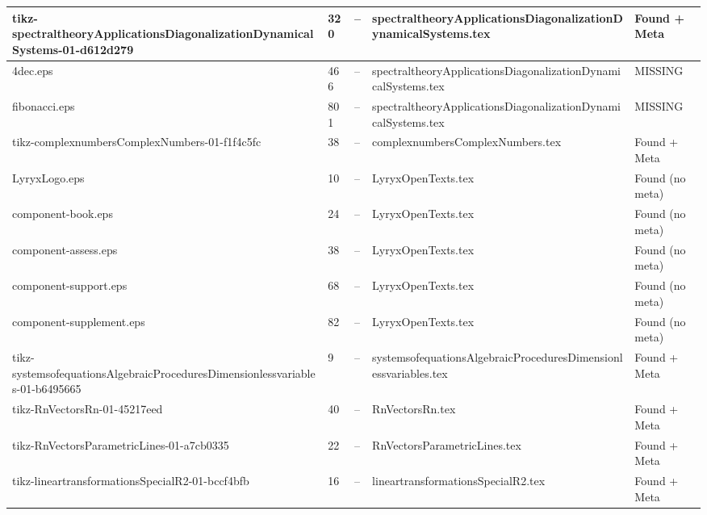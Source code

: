\documentclass[11pt]{article}
\begin{document}
\begin{longtable}{|p{3.5cm}|p{1.5cm}|p{1cm}|p{4cm}|p{2cm}|}
tikz-spectraltheoryApplicationsDiagonalizationDynamicalSystems-01-d612d279 & 320 & -- & spectraltheoryApplicationsDiagonalizationDynamicalSystems.tex & \textcolor{found}{Found + Meta} \\
\hline

4dec.eps & 466 & -- & spectraltheoryApplicationsDiagonalizationDynamicalSystems.tex & \textcolor{missing}{MISSING} \\
\hline

fibonacci.eps & 801 & -- & spectraltheoryApplicationsDiagonalizationDynamicalSystems.tex & \textcolor{missing}{MISSING} \\
\hline

tikz-complexnumbersComplexNumbers-01-f1f4c5fc & 38 & -- & complexnumbersComplexNumbers.tex & \textcolor{found}{Found + Meta} \\
\hline

LyryxLogo.eps & 10 & -- & LyryxOpenTexts.tex & \textcolor{warning}{Found (no meta)} \\
\hline

component-book.eps & 24 & -- & LyryxOpenTexts.tex & \textcolor{warning}{Found (no meta)} \\
\hline

component-assess.eps & 38 & -- & LyryxOpenTexts.tex & \textcolor{warning}{Found (no meta)} \\
\hline

component-support.eps & 68 & -- & LyryxOpenTexts.tex & \textcolor{warning}{Found (no meta)} \\
\hline

component-supplement.eps & 82 & -- & LyryxOpenTexts.tex & \textcolor{warning}{Found (no meta)} \\
\hline

tikz-systemsofequationsAlgebraicProceduresDimensionlessvariables-01-b6495665 & 9 & -- & systemsofequationsAlgebraicProceduresDimensionlessvariables.tex & \textcolor{found}{Found + Meta} \\
\hline

tikz-RnVectorsRn-01-45217eed & 40 & -- & RnVectorsRn.tex & \textcolor{found}{Found + Meta} \\
\hline

tikz-RnVectorsParametricLines-01-a7cb0335 & 22 & -- & RnVectorsParametricLines.tex & \textcolor{found}{Found + Meta} \\
\hline

tikz-lineartransformationsSpecialR2-01-bccf4bfb & 16 & -- & lineartransformationsSpecialR2.tex & \textcolor{found}{Found + Meta} \\
\hline


\end{longtable}
\end{document}
